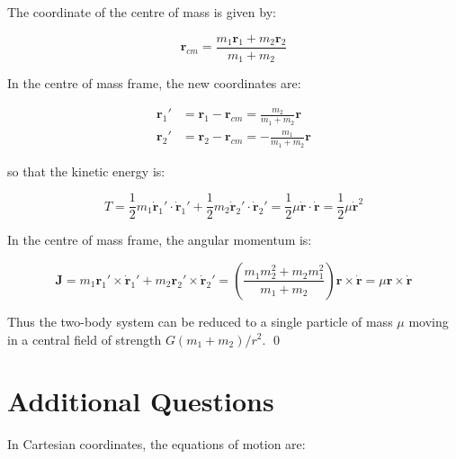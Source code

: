 \documentclass[12pt]{article}
\begin{document}
The coordinate of the centre of mass is given by:

\begin{equation}
    \mathbf{r}_{cm} = \frac{m_{1}\mathbf{r}_{1} + m_{2}\mathbf{r}_{2}}{m_{1} + m_{2}}
\end{equation}

In the centre of mass frame, the new coordinates are:

\begin{equation}
\begin{split}
    \mathbf{r}_{1}' &= \mathbf{r}_{1} - \mathbf{r}_{cm} = \frac{m_{2}}{m_{1} + m_{2}} \mathbf{r} \\
    \mathbf{r}_{2}' &= \mathbf{r}_{2} - \mathbf{r}_{cm} = -\frac{m_{1}}{m_{1} + m_{2}} \mathbf{r}
\end{split}
\end{equation}

so that the kinetic energy is:

\begin{equation}
    T = \frac{1}{2} m_{1} \dot{\mathbf{r}}_{1}' \cdot \dot{\mathbf{r}}_{1}' + \frac{1}{2} m_{2} \dot{\mathbf{r}}_{2}' \cdot \dot{\mathbf{r}}_{2}' = \frac{1}{2} \mu \dot{\mathbf{r}} \cdot \dot{\mathbf{r}} = \frac{1}{2} \mu \dot{\mathbf{r}}^{2}
\end{equation}

In the centre of mass frame, the angular momentum is:

\begin{equation}
    \mathbf{J} = m_{1} \mathbf{r}_{1}' \times \dot{\mathbf{r}}_{1}' + m_{2} \mathbf{r}_{2}' \times \dot{\mathbf{r}}_{2}' = \left( \frac{m_{1}m_{2}^{2} + m_{2}m_{1}^{2}}{m_{1} + m_{2}} \right) \mathbf{r} \times \dot{\mathbf{r}} = \mu \mathbf{r} \times \dot{\mathbf{r}}
\end{equation}

Thus the two-body system can be reduced to a single particle of mass $\mu$ moving in a central field of strength $G(m_{1} + m_{2})/r^{2}$.
\qed


\pagebreak
\section*{Additional Questions}



In Cartesian coordinates, the equations of motion are:
\end{document}
